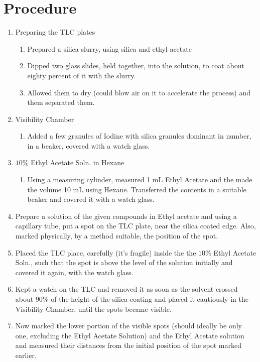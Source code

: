 \section{Procedure}	
	\begin{enumerate}
		\item Preparing the TLC plates
		\begin{enumerate}
			\item Prepared a silica slurry, using silica and ethyl acetate
			\item Dipped two glass slides, held together, into the solution, to coat about eighty percent of it with the slurry.
			\item Allowed them to dry (could blow air on it to accelerate the process) and them separated them.	
		\end{enumerate}
		\item Visibility Chamber
		\begin{enumerate}
			\item Added a few granules of Iodine with silica granules dominant in number, in a beaker, covered with a watch glass.
		\end{enumerate}
		\item $10\%$ Ethyl Acetate Soln. in Hexane
		\begin{enumerate}
			\item Using a measuring cylinder, measured 1 mL Ethyl Acetate and the made the volume 10 mL using Hexane. Transferred the contents in a suitable beaker and covered it with a watch glass.
		\end{enumerate}
		\item Prepare a solution of the given compounds in Ethyl acetate and using a capillary tube, put a spot on the TLC plate, near the silica coated edge. Also, marked physically, by a method suitable, the position of the spot. 
		\item Placed the TLC place, carefully (it's fragile) inside the the $10\%$ Ethyl Acetate Soln., such that the spot is above the level of the solution initially and covered it again, with the watch glass. 
		\item Kept a watch on the TLC and removed it as soon as the solvent crossed about $90\%$ of the height of the silica coating and placed it cautiously in the Visibility Chamber, until the spots became visible.
		\item Now marked the lower portion of the visible spots (should ideally be only one, excluding the Ethyl Acetate Solution) and the Ethyl Acetate solution and measured their distances from the initial position of the spot marked earlier.
	\end{enumerate}
